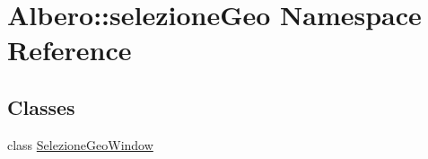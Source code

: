 \hypertarget{namespaceAlbero_1_1selezioneGeo}{
\section{Albero::selezioneGeo Namespace Reference}
\label{namespaceAlbero_1_1selezioneGeo}
}
\subsection*{Classes}
\begin{DoxyCompactItemize}
\item 
class \hyperlink{classAlbero_1_1selezioneGeo_1_1SelezioneGeoWindow}{SelezioneGeoWindow}
\end{DoxyCompactItemize}
